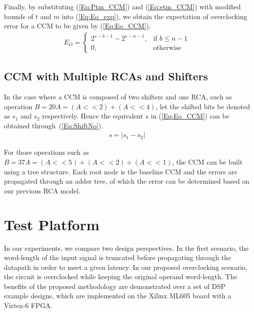 \documentclass[prodmode,acmtrets]{acmsmall} %
\begin{document}
Finally, by substituting (\ref{Eq:Ptm_CCM}) and (\ref{Eq:etm_CCM}) with modified bounds of $t$ and $m$ into (\ref{Eq:Eo_exp}), we obtain the expectation of overclocking error for a CCM to be given by (\ref{Eq:Eo_CCM}).
%
\begin{eqnarray}\label{Eq:Eo_CCM}
      E_O=\left\{
        \begin{matrix}
            2^{s-b-1}-2^{s-n-1}, & \textrm{if $b\leq n-1$}\\
            0, & \textrm{otherwise}
        \end{matrix}
      \right.
\end{eqnarray}

\subsection{CCM with Multiple RCAs and Shifters}\label{CCM_Multi}
In the case where a CCM is composed of two shifters and one RCA, such as operation $B=20A=(A<<2)+(A<<4)$, let the shifted bits be denoted as $s_1$ and $s_2$ respectively. Hence the equivalent $s$ in (\ref{Eq:Eo_CCM}) can be obtained through~(\ref{Eq:ShiftNo}).
%
\begin{eqnarray}\label{Eq:ShiftNo}
  s=\left|s_1-s_2\right|
\end{eqnarray}

For those operations such as $B=37A=(A<<5)+(A<<2)+(A<<1)$, the CCM can be built using a tree structure. Each root node is the baseline CCM and the errors are propagated through an adder tree, of which the error can be determined based on our previous RCA model.

\section{Test Platform}\label{Section_ExpSetup}
In our experiments, we compare two design perspectives. In the first scenario, the word-length of the input signal is truncated before propagating through the datapath in order to meet a given latency. In our proposed overclocking scenario, the circuit is overclocked while keeping the original operand word-length. The benefits of the proposed methodology are demonstrated over a set of DSP example designs, which are implemented on the Xilinx ML605 board with a Virtex-6 FPGA.
\end{document}
